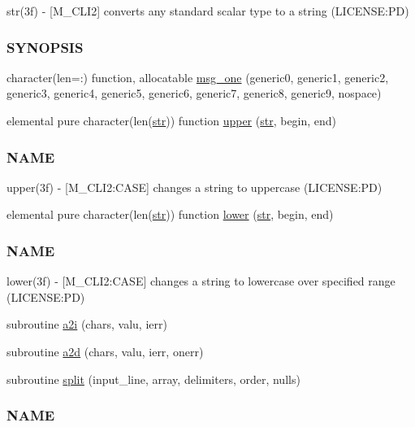 \begin{DoxyCompactItemize}
\begin{DoxyCompactList}
str(3f) -\/ \mbox{[}M\+\_\+\+C\+L\+I2\mbox{]} converts any standard scalar type to a string (L\+I\+C\+E\+N\+SE\+:PD) \subsubsection*{S\+Y\+N\+O\+P\+S\+IS}\end{DoxyCompactList}\item 
character(len=\+:) function, allocatable \mbox{\hyperlink{namespacem__cli2_a368e9aaa556f69228e7f0837bd558b82}{msg\+\_\+one}} (generic0, generic1, generic2, generic3, generic4, generic5, generic6, generic7, generic8, generic9, nospace)
\item 
elemental pure character(len(\mbox{\hyperlink{interfacem__cli2_1_1str}{str}})) function \mbox{\hyperlink{namespacem__cli2_afa7a2419002024ff6d950c5d905ddd7a}{upper}} (\mbox{\hyperlink{interfacem__cli2_1_1str}{str}}, begin, end)
\begin{DoxyCompactList}\small\item\em \subsubsection*{N\+A\+ME}

upper(3f) -\/ \mbox{[}M\+\_\+\+C\+L\+I2\+:C\+A\+SE\mbox{]} changes a string to uppercase (L\+I\+C\+E\+N\+SE\+:PD) \end{DoxyCompactList}\item 
elemental pure character(len(\mbox{\hyperlink{interfacem__cli2_1_1str}{str}})) function \mbox{\hyperlink{namespacem__cli2_a6d2d93ab8471667e632bf7a0e95ebd13}{lower}} (\mbox{\hyperlink{interfacem__cli2_1_1str}{str}}, begin, end)
\begin{DoxyCompactList}\small\item\em \subsubsection*{N\+A\+ME}

lower(3f) -\/ \mbox{[}M\+\_\+\+C\+L\+I2\+:C\+A\+SE\mbox{]} changes a string to lowercase over specified range (L\+I\+C\+E\+N\+SE\+:PD) \end{DoxyCompactList}\item 
subroutine \mbox{\hyperlink{namespacem__cli2_a0be58233adafc0bf10dfe69300a05b9f}{a2i}} (chars, valu, ierr)
\item 
subroutine \mbox{\hyperlink{namespacem__cli2_ad9e1de0ea9d2b4ed758b2a76bf143bd2}{a2d}} (chars, valu, ierr, onerr)
\item 
subroutine \mbox{\hyperlink{namespacem__cli2_a6578e29ee4dc56651528e7e0acd29665}{split}} (input\+\_\+line, array, delimiters, order, nulls)
\begin{DoxyCompactList}\small\item\em \subsubsection*{N\+A\+ME}


\end{DoxyCompactList}
\end{DoxyCompactItemize}
